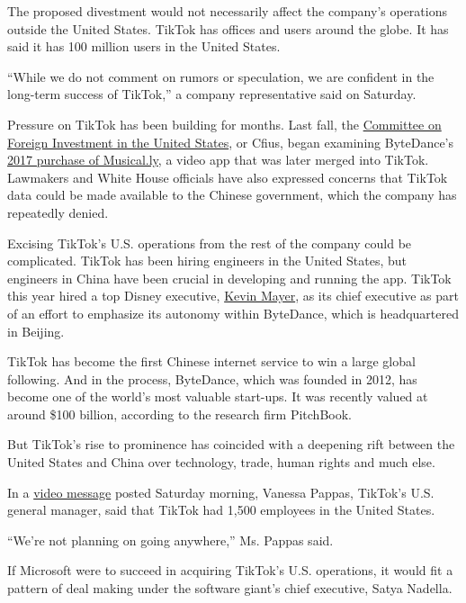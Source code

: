 The proposed divestment would not necessarily affect the company's
operations outside the United States. TikTok has offices and users
around the globe. It has said it has 100 million users in the United
States.

``While we do not comment on rumors or speculation, we are confident in
the long-term success of TikTok,'' a company representative said on
Saturday.

Pressure on TikTok has been building for months. Last fall, the
\href{https://www.nytimes.com/2019/11/01/technology/tiktok-national-security-review.html}{Committee
on Foreign Investment in the United States}, or Cfius, began examining
ByteDance's
\href{https://www.nytimes.com/2017/11/10/business/dealbook/musically-sold-app-video.html}{2017
purchase of Musical.ly}, a video app that was later merged into TikTok.
Lawmakers and White House officials have also expressed concerns that
TikTok data could be made available to the Chinese government, which the
company has repeatedly denied.

Excising TikTok's U.S. operations from the rest of the company could be
complicated. TikTok has been hiring engineers in the United States, but
engineers in China have been crucial in developing and running the app.
TikTok this year hired a top Disney executive,
\href{https://www.nytimes.com/2020/05/18/business/media/tiktok-ceo-kevin-mayer.html}{Kevin
Mayer}, as its chief executive as part of an effort to emphasize its
autonomy within ByteDance, which is headquartered in Beijing.

TikTok has become the first Chinese internet service to win a large
global following. And in the process, ByteDance, which was founded in
2012, has become one of the world's most valuable start-ups. It was
recently valued at around \$100 billion, according to the research firm
PitchBook.

But TikTok's rise to prominence has coincided with a deepening rift
between the United States and China over technology, trade, human rights
and much else.

In a
\href{https://twitter.com/tiktok_us/status/1289565422350553091}{video
message} posted Saturday morning, Vanessa Pappas, TikTok's U.S. general
manager, said that TikTok had 1,500 employees in the United States.

``We're not planning on going anywhere,'' Ms. Pappas said.

If Microsoft were to succeed in acquiring TikTok's U.S. operations, it
would fit a pattern of deal making under the software giant's chief
executive, Satya Nadella.

